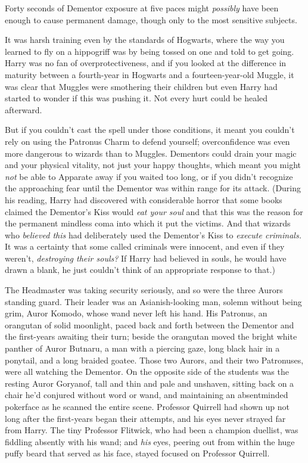 Forty seconds of Dementor exposure at five paces might \emph{possibly} have
been enough to cause permanent damage, though only to the most sensitive
subjects.

It was harsh training even by the standards of Hogwarts, where the way you
learned to fly on a hippogriff was by being tossed on one and told to get
going. Harry was no fan of overprotectiveness, and if you looked at the
difference in maturity between a fourth-year in Hogwarts and a
fourteen-year-old Muggle, it was clear that Muggles were smothering their
children{\el} but even Harry had started to wonder if this was pushing it.
Not every hurt could be healed afterward.

But if you couldn't cast the spell under those conditions, it meant you
couldn't rely on using the Patronus Charm to defend yourself; overconfidence
was even more dangerous to wizards than to Muggles. Dementors could drain your
magic and your physical vitality, not just your happy thoughts, which meant you
might \emph{not} be able to Apparate away if you waited too long, or if you
didn't recognize the approaching fear until the Dementor was within range for
its attack. (During his reading, Harry had discovered with considerable horror
that some books claimed the Dementor's Kiss would \emph{eat your soul} and that
this was the reason for the permanent mindless coma into which it put the
victims. And that wizards who \emph{believed this} had deliberately used the
Dementor's Kiss to \emph{execute criminals.} It was a certainty that some
called criminals were innocent, and even if they weren't, \emph{destroying
their souls?} If Harry had believed in souls, he would have{\el} drawn a
blank, he just couldn't think of an appropriate response to that.)

The Headmaster was taking security seriously, and so were the three Aurors
standing guard. Their leader was an Asianish-looking man, solemn without being
grim, Auror Komodo, whose wand never left his hand. His Patronus, an orangutan
of solid moonlight, paced back and forth between the Dementor and the
first-years awaiting their turn; beside the orangutan moved the bright white
panther of Auror Butnaru, a man with a piercing gaze, long black hair in a
ponytail, and a long braided goatee. Those two Aurors, and their two
Patronuses, were all watching the Dementor. On the opposite side of the
students was the resting Auror Goryanof, tall and thin and pale and unshaven,
sitting back on a chair he'd conjured without word or wand, and maintaining an
absentminded pokerface as he scanned the entire scene. Professor Quirrell had
shown up not long after the first-years began their attempts, and his eyes
never strayed far from Harry. The tiny Professor Flitwick, who had been a
champion duellist, was fiddling absently with his wand; and \emph{his} eyes,
peering out from within the huge puffy beard that served as his face, stayed
focused on Professor Quirrell.

